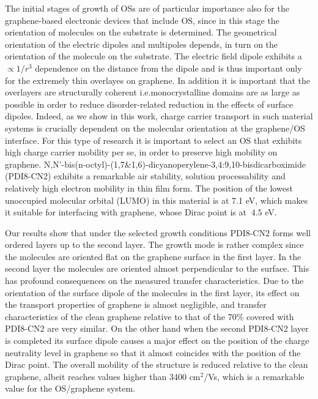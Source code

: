 \documentclass[review]{elsarticle}
\begin{document}
The initial stages of growth of OSs are of particular importance also for  the graphene-based electronic devices that include OS, since in this stage the orientation of molecules on the substrate is determined.
 The geometrical orientation of the electric dipoles and multipoles depends, in turn on the orientation of the molecule on the substrate\cite{geng-2012}.
 The electric field dipole exhibits a $\propto 1/r^{3}$ dependence on the distance from the dipole and is thus important only for the extremely thin overlayes on graphene.
 In addition it is important that the overlayers are structurally coherent i.e.monocrystalline domains are as large as possible in order to reduce disorder-related reduction in the effects of surface dipoles.
 Indeed, as  we show in this work, charge carrier transport in such material systems is crucially dependent on the molecular orientation at the graphene/OS interface.
 For this type of research it is important to select an OS that exhibits high charge carrier mobility per se, in order to preserve high mobility on graphene.
   N,N'-bis(n-octyl)-(1,7\&1,6)-dicyanoperylene-3,4:9,10-bisdicarboximide (PDI8-CN2)
 exhibits a remarkable air stability, solution processability and relatively high electron mobility in thin film form\cite{jung-2014,molinari-2009,piliego-2009a}.  The position of the lowest unoccupied molecular orbital (LUMO) in this material is at 7.1 eV\cite{jung-2014}, which makes it suitable for interfacing with graphene, whose Dirac point is at $~4.5$ eV.


Our results show that under the selected growth conditions PDI8-CN2 forms well ordered layers up to the second layer.
 The growth mode is rather complex since the molecules are oriented flat on the graphene surface in the first layer.
 In the second layer the molecules are oriented almost perpendicular to the surface.
 This has profound consequences on the measured transfer characteristics.
 Due to the orientation of the surface dipole of the molecules in the first layer, its effect on the transport properties of graphene is almost negligible, and transfer characteristics of the clean graphene relative to that of the 70\% covered with PDI8-CN2 are very similar. On the other hand when the second PDI8-CN2 layer is completed its surface dipole causes a major effect on the position of the charge neutrality level in graphene so that it almost coincides with the position of the Dirac point.
  The overall mobility of the structure is reduced relative to the clean graphene, albeit reaches values higher than 3400 cm$^{2}$/Vs, which is a remarkable value for the OS/graphene system.
 
\end{document}
